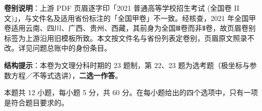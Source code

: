 

\begin{gknotice}
\textbf{卷别说明}：上游 PDF 页眉逐字印「2021 普通高等学校招生考试 (全国卷 II 文)」，与文件名及适用省份标注的「全国甲卷」不一致。经核查，2021 年全国甲卷适用云南、四川、广西、贵州、西藏，其前身为全国Ⅲ卷而非Ⅱ卷，故页眉卷别标签为上游沿用旧模板所致。本文按文件名与省份列表定卷别，页眉原文照录不改。详见问题总账中的身份条目。

\textbf{结构提示}：本卷为文理分科时期的 23 题制，第 22、23 题为选考题（极坐标与参数方程／不等式选讲），\textbf{二选一作答}。
\end{gknotice}

\par\medskip


\begin{gktip}
本题共 12 小题，每小题 5 分，共 60 分。在每小题给出的四个选项中，只有一项是符合题目要求的。
\end{gktip}

